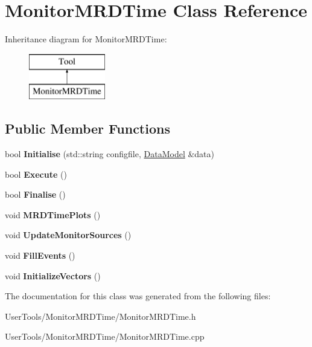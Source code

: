 \hypertarget{classMonitorMRDTime}{\section{Monitor\-M\-R\-D\-Time Class Reference}
\label{classMonitorMRDTime}
}
Inheritance diagram for Monitor\-M\-R\-D\-Time\-:\begin{figure}[H]
\begin{center}
\leavevmode
\includegraphics[height=2.000000cm]{classMonitorMRDTime}
\end{center}
\end{figure}
\subsection*{Public Member Functions}
\begin{DoxyCompactItemize}
\item 
\hypertarget{classMonitorMRDTime_a0eb95583c6a147059859b56c0c2687ee}{bool {\bfseries Initialise} (std\-::string configfile, \hyperlink{classDataModel}{Data\-Model} \&data)}\label{classMonitorMRDTime_a0eb95583c6a147059859b56c0c2687ee}

\item 
\hypertarget{classMonitorMRDTime_af322d7679b5199d91caec6ca69226995}{bool {\bfseries Execute} ()}\label{classMonitorMRDTime_af322d7679b5199d91caec6ca69226995}

\item 
\hypertarget{classMonitorMRDTime_ad9b436fb72af740b16468463a50eefe6}{bool {\bfseries Finalise} ()}\label{classMonitorMRDTime_ad9b436fb72af740b16468463a50eefe6}

\item 
\hypertarget{classMonitorMRDTime_affa1155c36568467e553b8e9460ecf8a}{void {\bfseries M\-R\-D\-Time\-Plots} ()}\label{classMonitorMRDTime_affa1155c36568467e553b8e9460ecf8a}

\item 
\hypertarget{classMonitorMRDTime_ad2e2bfb694d2bf99d189f7b4496da16a}{void {\bfseries Update\-Monitor\-Sources} ()}\label{classMonitorMRDTime_ad2e2bfb694d2bf99d189f7b4496da16a}

\item 
\hypertarget{classMonitorMRDTime_ad3380e8bac12fc88745a15dd0b68ed09}{void {\bfseries Fill\-Events} ()}\label{classMonitorMRDTime_ad3380e8bac12fc88745a15dd0b68ed09}

\item 
\hypertarget{classMonitorMRDTime_a3a81ee4967f10349d1f6571f7f4a8696}{void {\bfseries Initialize\-Vectors} ()}\label{classMonitorMRDTime_a3a81ee4967f10349d1f6571f7f4a8696}

\end{DoxyCompactItemize}


The documentation for this class was generated from the following files\-:\begin{DoxyCompactItemize}
\item 
User\-Tools/\-Monitor\-M\-R\-D\-Time/Monitor\-M\-R\-D\-Time.\-h\item 
User\-Tools/\-Monitor\-M\-R\-D\-Time/Monitor\-M\-R\-D\-Time.\-cpp\end{DoxyCompactItemize}
